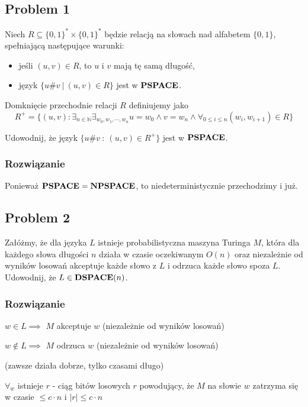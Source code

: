 \subsection{Problem 1}
Niech $R \subseteq \{0, 1\}^* \times \{0, 1\}^*$ będzie relacją na słowach nad alfabetem $\{0, 1\}$, spełniającą następujące warunki:
\begin{itemize}
    \item jeśli $(u, v) \in R$, to $u$ i $v$ mają tę samą długość,
    \item język $\{u\#v\ |\ (u, v) \in R\}$ jest w $\textbf{PSPACE}$. 
\end{itemize}

Domknięcie przechodnie relacji $R$ definiujemy jako
\[
    R^+ = \{(u, v) : \exists_{n \in \mathbb{N}} \exists_{w_0, w_1, \cdots, w_n} u = w_0 \land v = w_n \land \forall_{0 \leq i \leq n} (w_i, w_{i+1}) \in R \}
\]

Udowodnij, że język $\{u\#v\ :\ (u, v) \in R^+\}$ jest w $\textbf{PSPACE}$.

\subsubsection*{Rozwiązanie}

Ponieważ $\textbf{PSPACE} = \textbf{NPSPACE}$, to niedeterministycznie przechodzimy i już.

\subsection{Problem 2}
Załóżmy, że dla języka $L$ istnieje probabilistyczna maszyna Turinga $M$, która dla każdego słowa długości $n$ działa w czasie oczekiwanym $O(n)$ oraz niezależnie od wyników losowań akceptuje każde słowo z $L$ i odrzuca każde słowo spoza $L$. Udowodnij, że $L \in \textbf{DSPACE}(n)$.

\subsubsection*{Rozwiązanie}

$w \in L \implies$ $M$ akceptuje $w$ (niezależnie od wyników losowań)

$w \not\in L \implies$ $M$ odrzuca $w$ (niezależnie od wyników losowań)

(zawsze działa dobrze, tylko czasami długo)

$\forall_{w}$ istnieje $r$ - ciąg bitów losowych $r$ powodujący, że $M$ na słowie $w$ zatrzyma się w czasie $\leq c \cdot n$ i $|r| \leq c \cdot n$


